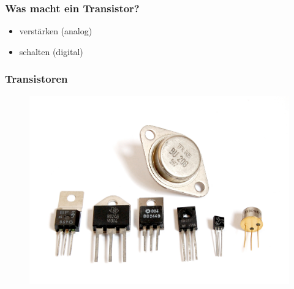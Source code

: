 

\subtitle{Technik Klasse E 13: \\
          Transistor \& Verstärker \\[2em]}
\date{Stand 25.11.2015}


\begin{frame}
\frametitle{Was macht ein Transistor?}
   	\begin{itemize}
	
	 \item verstärken (analog)
         \item schalten (digital)
  	\end{itemize}	
\end{frame}
\begin{frame}
  \frametitle{Transistoren}
  \begin{figure}
    \includegraphics[width=\textwidth,height=.65\textheight,keepaspectratio]{e13/Transistors-white.jpg}
  \end{figure}
\end{frame}
